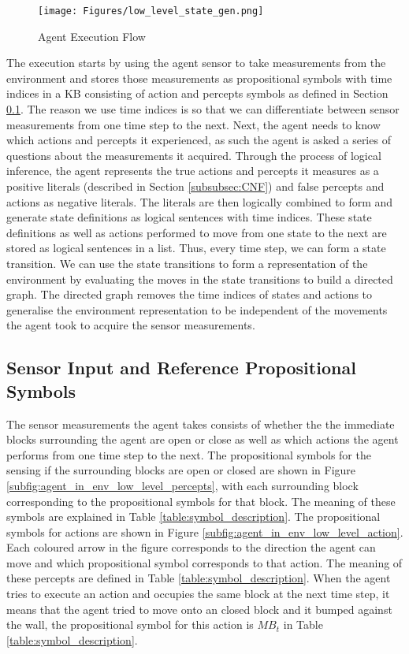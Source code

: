 \begin{figure}[H]
    \centering
    \texttt{[image: Figures/low\_level\_state\_gen.png]}
    \caption{Agent Execution Flow} 
    \label{fig:agent_in_env_low_level}
\end{figure}

The execution starts by using the agent sensor to take measurements from the environment and stores those measurements as propositional symbols with time indices in a KB consisting of action and percepts symbols as defined in Section \ref{subsec: sensor_prop_symbols}. The reason we use time indices is so that we can differentiate between sensor measurements from one time step to the next. Next, the agent needs to know which actions and percepts it experienced, as such the agent is asked a series of questions about the measurements it acquired. Through the process of logical inference, the agent represents the true actions and percepts it measures as a positive literals (described in Section \ref{subsubsec:CNF}) and false percepts and actions as negative literals. The literals are then logically combined to form and generate state definitions as logical sentences with time indices. These state definitions as well as actions performed to move from one state to the next are stored as logical sentences in a list. Thus, every time step, we can form a state transition. We can use the state transitions to form a representation of the environment by evaluating the moves in the state transitions to build a directed graph. The directed graph removes the time indices of states and actions to generalise the environment representation to be independent of the movements the agent took to acquire the sensor measurements.


\subsection{Sensor Input and Reference Propositional Symbols}
\label{subsec: sensor_prop_symbols}

The sensor measurements the agent takes consists of whether the the immediate blocks surrounding the agent are open or close as well as which actions the agent performs from one time step to the next. The propositional symbols for the sensing if the surrounding blocks are open or closed are shown in Figure \ref{subfig:agent_in_env_low_level_percepts}, with each surrounding block corresponding to the propositional symbols for that block. The meaning of these symbols are explained in Table \ref{table:symbol_description}. The propositional symbols for actions are shown in  Figure \ref{subfig:agent_in_env_low_level_action}. Each coloured arrow in the figure corresponds to the direction the agent can move and which propositional symbol corresponds to that action. The meaning of these percepts are defined in Table \ref{table:symbol_description}. When the agent tries to execute an action and occupies the same block at the next time step, it means that the agent tried to move onto an closed block and it bumped against the wall, the propositional symbol for this action is $MB_{t}$ in Table \ref{table:symbol_description}.

